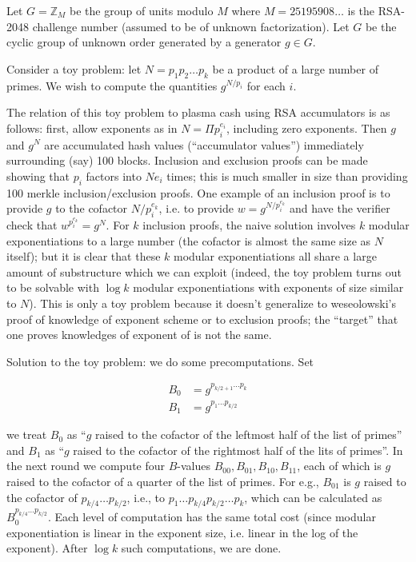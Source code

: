 \documentclass{article}
\begin{document}
Let $G = \mathbb{Z}_M$ be the group of units modulo $M$ where $M = 25195908 \ldots$ is the RSA-2048 challenge number (assumed to be of unknown factorization). Let $G$ be the cyclic group of unknown order generated by a generator $g \in G$.

Consider a toy problem: let $N = p_1 p_2 \ldots p_k$ be a product of a large number of primes. We wish to compute the quantities $g^{N/p_i}$ for each $i$.

The relation of this toy problem to plasma cash using RSA accumulators is as follows: first, allow exponents as in $N = \Pi p_i^{e_i}$, including zero exponents. Then $g$ and $g^N$ are accumulated hash values (``accumulator values'') immediately surrounding (say) 100 blocks. Inclusion and exclusion proofs can be made showing that $p_i$ factors into $N e_i$ times; this is much smaller in size than providing 100 merkle inclusion/exclusion proofs. One example of an inclusion proof is to provide $g$ to the cofactor $N/{p_i^{e_k}}$, i.e. to provide $w = g^{N/{p_i^{e_k}}}$ and have the verifier check that $w^{p_i^{e_k}} = g^N$. For $k$ inclusion proofs, the naive solution involves $k$ modular exponentiations to a large number (the cofactor is almost the same size as $N$ itself); but it is clear that these $k$ modular exponentiations all share a large amount of substructure which we can exploit (indeed, the toy problem turns out to be solvable with $\log k$ modular exponentiations with exponents of size similar to $N$). This is only a toy problem because it doesn't generalize to weseolowski's proof of knowledge of exponent scheme or to exclusion proofs; the ``target'' that one proves knowledges of exponent of is not the same.

Solution to the toy problem: we do some precomputations. Set

\begin{align*}
B_0 &= g^{p_{k/2 + 1} \ldots p_{k}} \\
B_1 &= g^{p_1 \ldots p_{k/2}}
\end{align*}

we treat $B_0$ as ``$g$ raised to the cofactor of the leftmost half of the list of primes'' and $B_1$ as ``$g$ raised to the cofactor of the rightmost half of the lits of primes''. In the next round we compute four $B$-values $B_{00}, B_{01}, B_{10}, B_{11}$, each of which is $g$ raised to the cofactor of a quarter of the list of primes. For e.g., $B_{01}$ is $g$ raised to the cofactor of $p_{k/4} \ldots p_{k/2}$, i.e., to $p_1 \ldots p_{k/4} p_{k/2} \ldots p_k$, which can be calculated as $B_0^{p_{k/4} \ldots p_{k/2}}$. Each level of computation has the same total cost (since modular exponentiation is linear in the exponent size, i.e. linear in the log of the exponent). After $\log k$ such computations, we are done.
\end{document}
